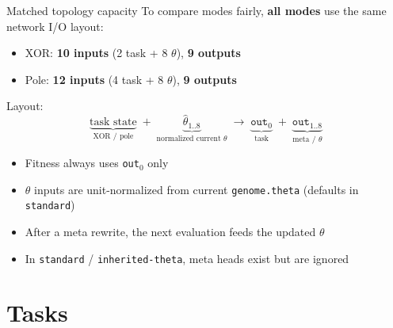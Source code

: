 \documentclass[aspectratio=169,11pt]{beamer}
\begin{document}
\begin{frame}{Matched topology capacity}
  To compare modes fairly, \textbf{all modes} use the same network I/O layout:

  \begin{itemize}
    \item XOR: \textbf{10 inputs} (2 task + 8 $\theta$), \textbf{9 outputs}
    \item Pole: \textbf{12 inputs} (4 task + 8 $\theta$), \textbf{9 outputs}
  \end{itemize}

  \vspace{0.5em}
  Layout:
  \[
    \underbrace{\text{task state}}_{\text{XOR / pole}} \;+\;
    \underbrace{\hat\theta_{1..8}}_{\text{normalized current $\theta$}}
    \;\rightarrow\;
    \underbrace{\texttt{out}_0}_{\text{task}} \;+\;
    \underbrace{\texttt{out}_{1..8}}_{\text{meta / $\theta$}}
  \]

  \begin{itemize}
    \item Fitness always uses \texttt{out}$_0$ only
    \item $\theta$ inputs are unit-normalized from current \texttt{genome.theta}
      (defaults in \texttt{standard})
    \item After a meta rewrite, the next evaluation feeds the updated $\theta$
    \item In \texttt{standard} / \texttt{inherited-theta}, meta heads exist but are ignored
  \end{itemize}
\end{frame}

\section{Tasks}
\end{document}

